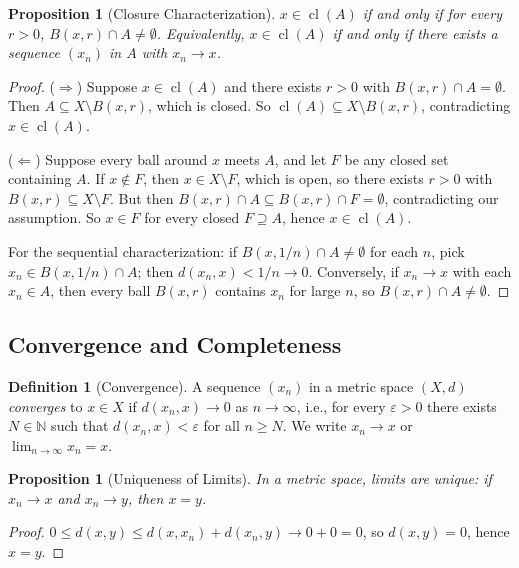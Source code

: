\documentclass[11pt,a4paper]{article}
\theoremstyle{definition}
\newtheorem{definition}{Definition}[section]
\theoremstyle{plain}
\newtheorem{proposition}[theorem]{Proposition}
\theoremstyle{remark}
\newcommand{\N}{\mathbb{N}}
\DeclareMathOperator{\cl}{cl}
\begin{document}
\begin{proposition}[Closure Characterization]
\label{prop:closure_char}
$x \in \cl(A)$ if and only if for every $r > 0$, $B(x,r) \cap A \ne \emptyset$.
Equivalently, $x \in \cl(A)$ if and only if there exists a sequence $(x_n)$ in $A$
with $x_n \to x$.
\end{proposition}

\begin{proof}
($\Rightarrow$) Suppose $x \in \cl(A)$ and there exists $r > 0$ with
$B(x,r) \cap A = \emptyset$. Then $A \subseteq X \setminus B(x,r)$, which is
closed. So $\cl(A) \subseteq X \setminus B(x,r)$, contradicting $x \in \cl(A)$.

($\Leftarrow$) Suppose every ball around $x$ meets $A$, and let $F$ be any closed
set containing $A$. If $x \notin F$, then $x \in X \setminus F$, which is open,
so there exists $r > 0$ with $B(x,r) \subseteq X \setminus F$. But then
$B(x,r) \cap A \subseteq B(x,r) \cap F = \emptyset$, contradicting our assumption.
So $x \in F$ for every closed $F \supseteq A$, hence $x \in \cl(A)$.

For the sequential characterization: if $B(x,1/n) \cap A \ne \emptyset$ for each
$n$, pick $x_n \in B(x,1/n) \cap A$; then $d(x_n,x) < 1/n \to 0$. Conversely, if
$x_n \to x$ with each $x_n \in A$, then every ball $B(x,r)$ contains $x_n$ for
large $n$, so $B(x,r) \cap A \ne \emptyset$.
\end{proof}

\subsection{Convergence and Completeness}
\label{subsec:convergence}

\begin{definition}[Convergence]
\label{def:convergence}
A sequence $(x_n)$ in a metric space $(X,d)$ \emph{converges} to $x \in X$ if
$d(x_n, x) \to 0$ as $n \to \infty$, i.e., for every $\varepsilon > 0$ there
exists $N \in \N$ such that $d(x_n, x) < \varepsilon$ for all $n \ge N$. We write
$x_n \to x$ or $\lim_{n \to \infty} x_n = x$.
\end{definition}

\begin{proposition}[Uniqueness of Limits]
\label{prop:unique_limit}
In a metric space, limits are unique: if $x_n \to x$ and $x_n \to y$, then $x = y$.
\end{proposition}

\begin{proof}
$0 \le d(x,y) \le d(x,x_n) + d(x_n,y) \to 0 + 0 = 0$, so $d(x,y) = 0$, hence $x = y$.
\end{proof}
\end{document}
